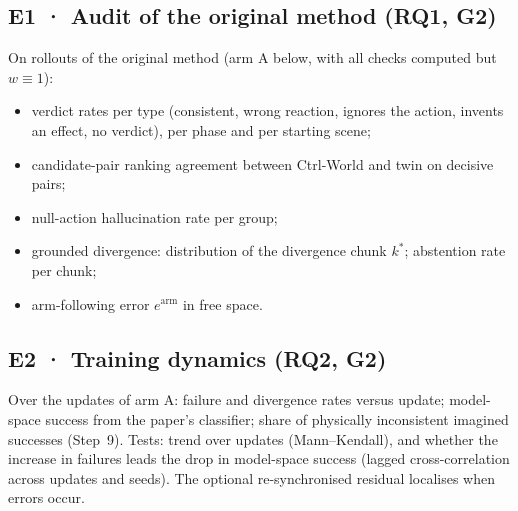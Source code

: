 \documentclass[11pt,a4paper]{article}
\theoremstyle{plain}
\theoremstyle{definition}
\theoremstyle{remark}
\begin{document}
\subsection{E1 · Audit of the original method (RQ1, G2)}
On rollouts of the original method (arm A below, with all checks computed but $w\equiv1$):
\begin{itemize}
\item verdict rates per type (consistent, wrong reaction, ignores the action, invents an effect, no verdict), per phase and per starting scene;
\item candidate-pair ranking agreement between Ctrl-World and twin on decisive pairs;
\item null-action hallucination rate per group;
\item grounded divergence: distribution of the divergence chunk $k^\ast$; abstention rate per chunk;
\item arm-following error $e^{\mathrm{arm}}$ in free space.
\end{itemize}

\subsection{E2 · Training dynamics (RQ2, G2)}
Over the updates of arm A: failure and divergence rates versus update; model-space success from the paper's classifier; share of physically inconsistent imagined successes (Step~9). Tests: trend over updates (Mann--Kendall), and whether the increase in failures leads the drop in model-space success (lagged cross-correlation across updates and seeds). The optional re-synchronised residual localises when errors occur.
\end{document}
